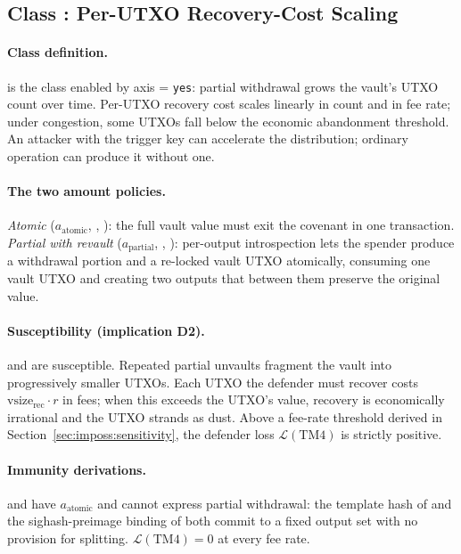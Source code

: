 \subsection{Class \classscale{}: Per-UTXO Recovery-Cost Scaling}
\label{sec:imposs:class_scale}

\paragraph{Class definition.} \classscale{} is the class enabled by
axis \axrevault{} = \texttt{yes}: partial withdrawal grows the
vault's UTXO count over time. Per-UTXO recovery cost scales linearly
in count and in fee rate; under congestion, some UTXOs fall below
the economic abandonment threshold. An attacker with the trigger
key can accelerate the distribution; ordinary operation can produce
it without one.

\paragraph{The two amount policies.} \emph{Atomic}
($a_{\text{atomic}}$, \opctv{}, \catcsfs{}): the full vault value
must exit the covenant in one transaction. \emph{Partial with
revault} ($a_{\text{partial}}$, \opccv{}, \opvault{}): per-output
introspection lets the spender produce a withdrawal portion and a
re-locked vault UTXO atomically, consuming one vault UTXO and
creating two outputs that between them preserve the original value.

\paragraph{Susceptibility (implication D2).} \opccv{} and \opvault{}
are susceptible. Repeated partial unvaults fragment the vault into
progressively smaller UTXOs. Each UTXO the defender must recover
costs $\text{vsize}_{\text{rec}} \cdot r$ in fees; when this exceeds
the UTXO's value, recovery is economically irrational and the UTXO
strands as dust. Above a fee-rate threshold derived in
Section~\ref{sec:imposs:sensitivity}, the defender loss
$\mathcal{L}(\mathrm{TM4})$ is strictly positive.

\paragraph{Immunity derivations.} \opctv{} and \catcsfs{} have
$a_{\text{atomic}}$ and cannot express partial withdrawal: the
template hash of \opctv{} and the sighash-preimage binding of
\catcsfs{} both commit to a fixed output set with no provision for
splitting. $\mathcal{L}(\mathrm{TM4}) = 0$ at every fee rate.

